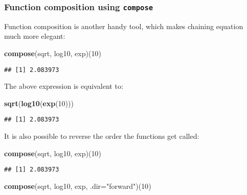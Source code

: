 \documentclass[
]{article}
\newenvironment{Shaded}{\begin{snugshade}}{\end{snugshade}}
\newcommand{\DataTypeTok}[1]{\textcolor[rgb]{0.13,0.29,0.53}{#1}}
\newcommand{\DecValTok}[1]{\textcolor[rgb]{0.00,0.00,0.81}{#1}}
\newcommand{\KeywordTok}[1]{\textcolor[rgb]{0.13,0.29,0.53}{\textbf{#1}}}
\newcommand{\NormalTok}[1]{#1}
\newcommand{\StringTok}[1]{\textcolor[rgb]{0.31,0.60,0.02}{#1}}
\begin{document}
\hypertarget{function-composition-using-compose}{%
\subsubsection{\texorpdfstring{Function composition using \texttt{compose}}{Function composition using compose}}\label{function-composition-using-compose}}

Function composition is another handy tool, which makes chaining equation much more elegant:

\begin{Shaded}
\begin{Highlighting}[]
\KeywordTok{compose}\NormalTok{(sqrt, log10, exp)(}\DecValTok{10}\NormalTok{)}
\end{Highlighting}
\end{Shaded}

\begin{verbatim}
## [1] 2.083973
\end{verbatim}

The above expression is equivalent to:

\begin{Shaded}
\begin{Highlighting}[]
\KeywordTok{sqrt}\NormalTok{(}\KeywordTok{log10}\NormalTok{(}\KeywordTok{exp}\NormalTok{(}\DecValTok{10}\NormalTok{)))}
\end{Highlighting}
\end{Shaded}

\begin{verbatim}
## [1] 2.083973
\end{verbatim}

It is also possible to reverse the order the functions get called:

\begin{Shaded}
\begin{Highlighting}[]
\KeywordTok{compose}\NormalTok{(sqrt, log10, exp)(}\DecValTok{10}\NormalTok{)}
\end{Highlighting}
\end{Shaded}

\begin{verbatim}
## [1] 2.083973
\end{verbatim}

\begin{Shaded}
\begin{Highlighting}[]
\KeywordTok{compose}\NormalTok{(sqrt, log10, exp, }\DataTypeTok{.dir=}\StringTok{"forward"}\NormalTok{)(}\DecValTok{10}\NormalTok{)}
\end{Highlighting}
\end{Shaded}
\end{document}
